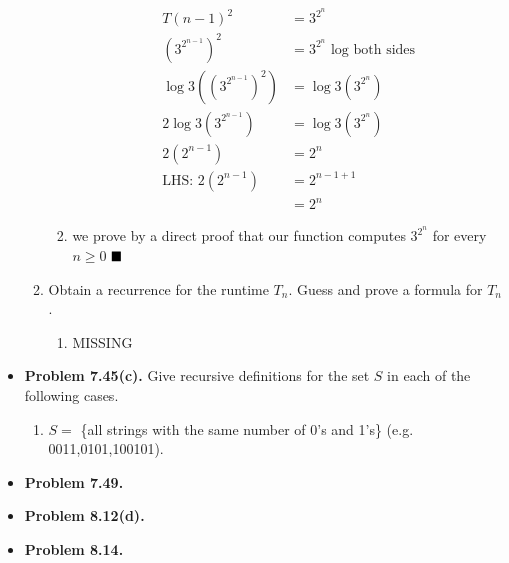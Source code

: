 \documentclass{article}
\begin{document}
\begin{itemize}
\begin{enumerate}[label=(\alph*)]
\begin{enumerate}[label=(\roman*)]
\begin{align*}
                    T(n-1)^2 &= 3^{2^n}\\
                    (3^{2^{n-1}})^2 &= 3^{2^n} \text{ log both sides}\\
                    \log{3}((3^{2^{n-1}})^2) &= \log{3}(3^{2^n})\\
                    2\log{3}(3^{2^{n-1}}) &= \log{3}(3^{2^n})\\
                    2(2^{n-1}) &= 2^n\\
                    \text{LHS: } 2(2^{n-1}) &= 2^{n-1+1}\\
                    &= 2^n
                \end{align*}
                \item we prove by a direct proof that our function computes $3^{2^n}$ for every $n \geq 0$ $\hfill\blacksquare$
            \end{enumerate}
            \item Obtain a recurrence for the runtime $T_n$. Guess and prove a formula for $T_n$.
            \begin{enumerate}[label=(\roman*)]
                \item MISSING
            \end{enumerate}
        \end{enumerate}
        \item \textbf{Problem 7.45(c).} Give recursive definitions for the set $S$ in each of the following cases.
        \begin{enumerate}[label=(c)]
            \item $S =$ \{all strings with the same number of 0's and 1's\} (e.g. 0011,0101,100101).
        \end{enumerate}
        \item \textbf{Problem 7.49.}
        \item \textbf{Problem 8.12(d).}
        \item \textbf{Problem 8.14.}
    \end{itemize}
    
\end{document}
